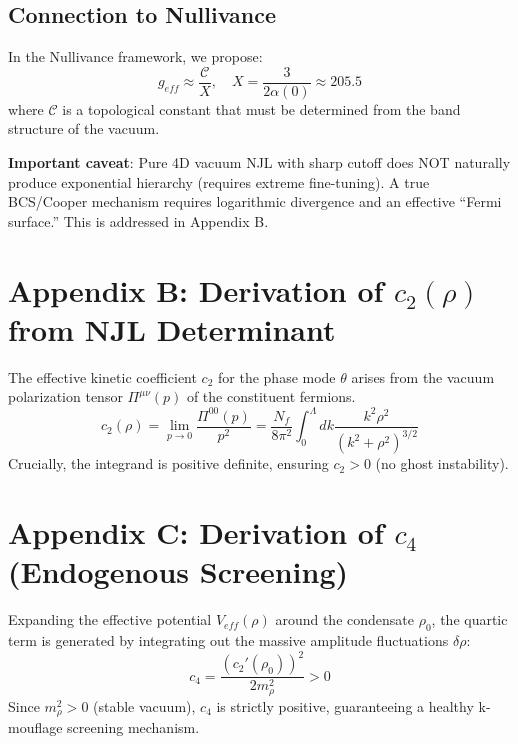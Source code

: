 \documentclass[a4paper,12pt]{article}
\begin{document}
\subsection{Connection to Nullivance}
In the Nullivance framework, we propose:
\begin{equation}
 g_{eff} \approx \frac{\mathcal{C}}{X}, \quad X = \frac{3}{2\alpha(0)} \approx 205.5
\end{equation}
where $\mathcal{C}$ is a topological constant that must be determined from the band structure of the vacuum.

\textbf{Important caveat}: Pure 4D vacuum NJL with sharp cutoff does NOT naturally produce exponential hierarchy (requires extreme fine-tuning). A true BCS/Cooper mechanism requires logarithmic divergence and an effective ``Fermi surface.'' This is addressed in Appendix B.

\newpage
\section{Appendix B: Derivation of $c_2(\rho)$ from NJL Determinant}
The effective kinetic coefficient $c_2$ for the phase mode $\theta$ arises from the vacuum polarization tensor $\Pi^{\mu\nu}(p)$ of the constituent fermions.
\begin{equation}
    c_2(\rho) = \lim_{p\to 0} \frac{\Pi^{00}(p)}{p^2} = \frac{N_f}{8\pi^2} \int_0^\Lambda dk \frac{k^2 \rho^2}{(k^2 + \rho^2)^{3/2}}
\end{equation}
Crucially, the integrand is positive definite, ensuring $c_2 > 0$ (no ghost instability).

\section{Appendix C: Derivation of $c_4$ (Endogenous Screening)}
Expanding the effective potential $V_{eff}(\rho)$ around the condensate $\rho_0$, the quartic term is generated by integrating out the massive amplitude fluctuations $\delta \rho$:
\begin{equation}
    c_4 = \frac{(c_2'(\rho_0))^2}{2 m_\rho^2} > 0
\end{equation}
Since $m_\rho^2 > 0$ (stable vacuum), $c_4$ is strictly positive, guaranteeing a healthy k-mouflage screening mechanism.
\end{document}
